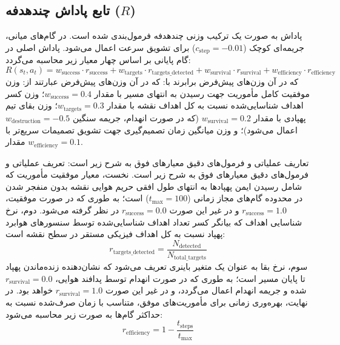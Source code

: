 \documentclass[oneside,openany,a4paper,12pt,draft]{article}
\begin{document}
\subsection{تابع پاداش چندهدفه ($R$)}
پاداش به صورت یک ترکیب وزنی چندهدفه فرمول‌بندی شده است. در گام‌های میانی، جریمه‌ای کوچک ($c_{\text{step}} = -0.01$) برای تشویق سرعت اعمال می‌شود. پاداش اصلی در گام پایانی بر اساس چهار معیار زیر محاسبه می‌گردد:
\begin{equation}
R(s_t, a_t) = w_{\text{success}} \cdot r_{\text{success}} + w_{\text{targets}} \cdot r_{\text{targets\_detected}} + w_{\text{survival}} \cdot r_{\text{survival}} + w_{\text{efficiency}} \cdot r_{\text{efficiency}}
\end{equation}
که در آن وزن‌های پیش‌فرض برابرند با:
که در آن وزن‌های پیش‌فرض عبارتند از: وزن موفقیت کامل مأموریت جهت رسیدن به انتهای مسیر با مقدار $w_{\text{success}} = 0.4$؛ وزن کسر اهداف شناسایی‌شده نسبت به کل اهداف نقشه با مقدار $w_{\text{targets}} = 0.3$؛ وزن بقای تیم پهپادی با مقدار $w_{\text{survival}} = 0.2$ (که در صورت انهدام، جریمه سنگین $w_{\text{destruction}} = -0.5$ اعمال می‌شود)؛ و وزن میانگین زمان تصمیم‌گیری جهت تشویق تصمیمات سریع‌تر با مقدار $w_{\text{efficiency}} = 0.1$.

تعاریف عملیاتی و فرمول‌های دقیق معیارهای فوق به شرح زیر است:
تعریف عملیاتی و فرمول‌های دقیق معیارهای فوق به شرح زیر است. نخست، معیار موفقیت مأموریت  که شامل رسیدن ایمن پهپادها به انتهای طول افقی حریم هوایی نقشه بدون منفجر شدن در محدوده گام‌های مجاز زمانی ($t_{\text{max}} = 100$) است؛ به طوری که در صورت موفقیت، $r_{\text{success}} = 1.0$ و در غیر این صورت $r_{\text{success}} = 0.0$ در نظر گرفته می‌شود. دوم، نرخ شناسایی اهداف  که بیانگر کسر تعداد اهداف شناسایی‌شده توسط سنسورهای هوابرد پهپاد نسبت به کل اهداف فیزیکی مستقر در سطح نقشه است:
\begin{equation}
r_{\text{targets\_detected}} = \frac{N_{\text{detected}}}{N_{\text{total\_targets}}}
\end{equation}
سوم، نرخ بقا  به عنوان یک متغیر باینری تعریف می‌شود که نشان‌دهنده زنده‌ماندن پهپاد تا پایان مسیر است؛ به طوری که در صورت انهدام توسط پدافند هوایی، $r_{\text{survival}} = 0.0$ شده و جریمه انهدام اعمال می‌گردد، و در غیر این صورت $r_{\text{survival}} = 1.0$ خواهد بود. در نهایت، بهره‌وری زمانی  برای مأموریت‌های موفق، متناسب با زمان صرف‌شده نسبت به حداکثر گام‌ها به صورت زیر محاسبه می‌شود:
\begin{equation}
r_{\text{efficiency}} = 1 - \frac{t_{\text{steps}}}{t_{\text{max}}}
\end{equation}
\end{document}
